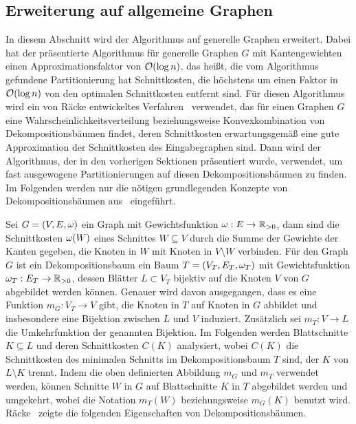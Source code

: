 \subsection{Erweiterung auf allgemeine Graphen}\label{sec:decomptrees}
In diesem Abschnitt wird der Algorithmus auf generelle Graphen erweitert.
Dabei hat der präsentierte Algorithmus für generelle Graphen $G$ mit Kantengewichten einen Approximationsfaktor von $\mathcal{O}(\log n)$, das heißt, die vom Algorithmus gefundene Partitionierung hat Schnittkosten, die höchstens um einen Faktor in $\mathcal{O}(\log n)$ von den optimalen Schnittkosten entfernt sind.
Für diesen Algorithmus wird ein von Räcke entwickeltes Verfahren~\parencite{rc08} verwendet, das für einen Graphen $G$ eine Wahrscheinlichkeitsverteilung beziehungsweise Konvexkombination von Dekompositionsbäumen findet, deren Schnittkosten erwartungsgemäß eine gute Approximation der Schnittkosten des Eingabegraphen sind. 
Dann wird der Algorithmus, der in den vorherigen Sektionen präsentiert wurde, verwendet, um fast ausgewogene Partitionierungen auf diesen Dekompositionsbäumen zu finden.
Im Folgenden werden nur die nötigen grundlegenden Konzepte von Dekompositionsbäumen aus~\parencite{rc08} eingeführt.

Sei $G = (V, E, \omega)$ ein Graph mit Gewichtsfunktion $\omega : E \rightarrow \mathbb{R}_{> 0}$, dann sind die Schnittkosten $\omega(W)$ eines Schnittes $W \subseteq V$ durch die Summe der Gewichte der Kanten gegeben, die Knoten in $W$ mit Knoten in $V \setminus W$ verbinden.
Für den Graph $G$ ist ein Dekompositionsbaum ein Baum $T=(V_T, E_T, \omega_T)$ mit Gewichtsfunktion $\omega_T : E_T \rightarrow \mathbb{R}_{> 0}$, dessen Blätter $L \subset V_T$ bijektiv auf die Knoten $V$ von $G$ abgebildet werden können.
Genauer wird davon ausgegangen, dass es eine Funktion $m_G : V_T \rightarrow V$ gibt, die Knoten in $T$ auf Knoten in $G$ abbildet und insbesondere eine Bijektion zwischen $L$ und $V$ induziert. 
Zusätzlich sei $m_T : V \rightarrow L$ die Umkehrfunktion der genannten Bijektion.
Im Folgenden werden Blattschnitte $K \subseteq L$ und deren Schnittkosten $C(K)$ analysiert, wobei $C(K)$ die Schnittkosten des minimalen Schnitts im Dekompositionsbaum $T$ sind, der $K$ von $L \setminus K$ trennt.
Indem die oben definierten Abbildung $m_G$ und $m_T$ verwendet werden, können Schnitte $W$ in $G$ auf Blattschnitte $K$ in $T$ abgebildet werden und umgekehrt, wobei die Notation $m_T(W)$ beziehungsweise $m_G(K)$ benutzt wird.
Räcke~\parencite{rc08} zeigte die folgenden Eigenschaften von Dekompositionsbäumen.

